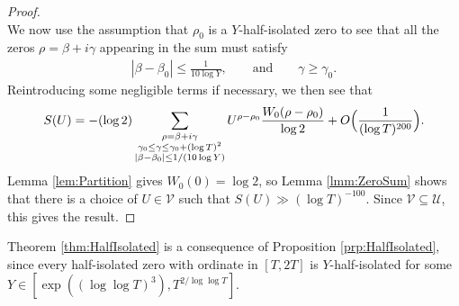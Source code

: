 \documentclass[12pt]{amsart}
\theoremstyle{plain}
\theoremstyle{definition}
\theoremstyle{remark}
\begin{document}
\begin{proof}
\[\]
%
We now use the assumption that $\rho_0$ is a $Y$-half-isolated zero to see that all the zeros $\rho=\beta+i\gamma$ appearing in the sum must satisfy
%
\begin{align*}
|\beta-\beta_0|\leq \frac{1}{10\log{Y}},\qquad \text{and} \qquad \gamma\ge\gamma_0.
\end{align*}
%
Reintroducing some negligible terms if necessary, we then see that
%
\[
S(U) = - (\log 2)\sum_{\substack{\rho=\beta+i\gamma\\ \gamma_0\le \gamma \le \gamma_0+(\log{T})^2\\ |\beta-\beta_0|\le 1/(10\log{Y})}}U^{\rho - \rho_0} \frac{W_0(\rho-\rho_0)}{\log 2} + O\Bigl(\frac{1}{(\log{T})^{200}}\Bigr).
\]
%
Lemma \ref{lem:Partition} gives $W_0(0)=\log 2$, so Lemma \ref{lmm:ZeroSum} shows that there is a choice of $U\in\mathcal{V}$ such that $S(U)\gg (\log{T})^{-100}$. Since $\mathcal{V}\subseteq\mathcal{U}$, this gives the result.
\end{proof}
%
%
%
%
Theorem \ref{thm:HalfIsolated} is a consequence of Proposition \ref{prp:HalfIsolated}, since every half-isolated zero with ordinate in $[T,2T]$ is $Y$-half-isolated for some $Y \in [\exp((\log \log T)^3), T^{2/\log \log T}]$.
%
%
%
%
\end{document}
